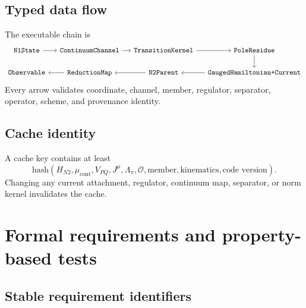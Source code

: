 \documentclass[11pt]{article}
\newcommand{\cO}{\mathcal O}
\begin{document}
\subsection{Typed data flow}

The executable chain is
\begin{equation}
 \begin{tikzcd}[column sep=small]
 \texttt{N1State}
 \arrow[r]
 &\texttt{ContinuumChannel}
 \arrow[r]
 &\texttt{TransitionKernel}
 \arrow[r]
 &\texttt{PoleResidue}
 \arrow[d]
 \\
 \texttt{Observable}
 &\texttt{ReductionMap}\arrow[l]
 &\texttt{N2Parent}\arrow[l]
 &\texttt{GaugedHamiltonian+Current}\arrow[l]
 \end{tikzcd}
 \label{eq:n2-data-flow}
\end{equation}
Every arrow validates coordinate, channel, member, regulator, separator,
operator, scheme, and provenance identity.

\subsection{Cache identity}

A cache key contains at least
\begin{equation}
 \mathrm{hash}
 \left(
 H_{N2},
 \mu_{\mathrm{cont}},
 V_{PQ},
 J^\mu,
 \Lambda_\pi,
 \cO,
 \text{member},
 \text{kinematics},
 \text{code version}
 \right).
 \label{eq:n2-cache}
\end{equation}
Changing any current attachment, regulator, continuum map, separator, or norm
kernel invalidates the cache.

\section{Formal requirements and property-based tests}
\label{sec:requirements}

\subsection{Stable requirement identifiers}
\end{document}
